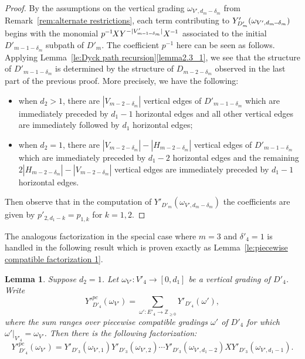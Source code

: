 \documentclass[10pt]{amsart}
\newtheorem{lemma}[theorem]{Lemma}
\theoremstyle{definition}
\newcommand{\ZZ}{\mathbb{Z}}
\newcommand*{\mk}{\mkern -1mu}
\newcommand*{\Mk}{\mkern -2mu}
\begin{document}
\begin{proof}
 By the assumptions on the vertical grading $\omega_{V',d_m-\delta_m}$ from Remark~\ref{rem:alternate restrictions}, each term contributing to $Y'_{D'_m}(\omega_{V',d_m\Mk -\Mk \delta_m})$ begins with the monomial $p^{\mk -\mk 1}\Mk XY^{-|V'_{m\mk -\mk 1\mk -\mk \delta_m}|}X^{\mk -\mk 1}$ associated to the initial $D'_{m-1-\delta_m}$ subpath of $D'_m$.
 The coefficient $p^{-1}$ here can be seen as follows. 
 Applying Lemma~\ref{le:Dyck path recursion}\ref{lemma2.3_1}, we see that the structure of $D'_{m-1-\delta_m}$ is determined by the structure of $D_{m-2-\delta_m}$ observed in the last part of the previous proof.
 More precisely, we have the following:
 \begin{itemize}
 \item when $d_2>1$, there are $|V_{m-2-\delta_m}|$ vertical edges of $D'_{m-1-\delta_m}$ which are immediately preceded by $d_1-1$ horizontal edges and all other vertical edges are immediately followed by $d_1$ horizontal edges;
 \item when $d_2=1$, there are $|V_{m-2-\delta_m}|-|H_{m-2-\delta_m}|$ vertical edges of $D'_{m-1-\delta_m}$ which are immediately preceded by $d_1-2$ horizontal edges and the remaining $2|H_{m-2-\delta_m}|-|V_{m-2-\delta_m}|$ vertical edges are immediately preceded by $d_1-1$ horizontal edges.
 \end{itemize}
 Then observe that in the computation of $Y'_{D'_m}(\omega_{V',d_m-\delta_m})$ the coefficients are given by $p'_{2,d_1-k}=p_{1,k}$ for $k=1,2$.
\end{proof}

The analogous factorization in the special case where $m=3$ and $\delta'_4=1$ is handled in the following result which is proven exactly as Lemma~\ref{le:piecewise compatible factorization 1}.
\begin{lemma}
 \label{le:piecewise compatible factorization 3}
 Suppose $d_2=1$. Let $\omega_{V'}:V'_4\to[0,d_1]$ be a vertical grading of $D'_4$.
 Write 
 \[{Y'}_{D'_4}^{pc}(\omega_{V'})=\sum\limits_{\omega':E'_4\to\ZZ_{\ge0}} Y'_{D'_4}(\omega'),\]
 where the sum ranges over piecewise compatible gradings $\omega'$ of $D'_4$ for which $\omega'|_{V'_4}=\omega_{V'}$.
 Then there is the following factorization:
 \begin{equation}
 \label{eq:piecewise compatible factorization 3}
 {Y'}_{D'_4}^{pc}(\omega_{V'})=Y'_{D'_3}(\omega_{V',1})Y'_{D'_3}(\omega_{V',2})\cdots Y'_{D'_3}(\omega_{V',d_1-2})X Y'_{D'_3}(\omega_{V',d_1-1}).
 \end{equation}
\end{lemma}
\end{document}
